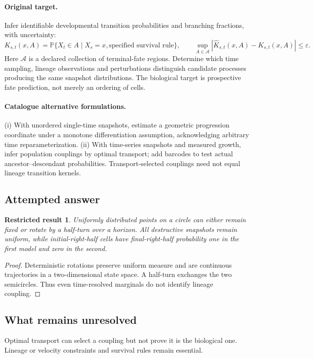\documentclass[11pt]{article}
\newcommand{\Prob}{\mathbb P}
\providecommand{\Prob}{\mathbb P}
\newtheorem{attemptresult}{Restricted result}[section]
\begin{document}
\paragraph{Original target.}
Infer identifiable developmental transition probabilities and branching fractions, with uncertainty:
\[K_{s,t}(x,A)=\Prob\{X_t\in A\mid X_s=x,\text{specified survival rule}\},\qquad \sup_{A\in\mathcal A}|\widehat K_{s,t}(x,A)-K_{s,t}(x,A)|\le\varepsilon.\]
Here $\mathcal A$ is a declared collection of terminal-fate regions. Determine which time sampling, lineage observations and perturbations distinguish candidate processes producing the same snapshot distributions. The biological target is prospective fate prediction, not merely an ordering of cells.
\paragraph{Catalogue alternative formulations.}
(i) With unordered single-time snapshots, estimate a geometric progression coordinate under a monotone differentiation assumption, acknowledging arbitrary time reparameterization. (ii) With time-series snapshots and measured growth, infer population couplings by optimal transport; add barcodes to test actual ancestor--descendant probabilities. Transport-selected couplings need not equal lineage transition kernels.
\subsection{Attempted answer}
\begin{attemptresult}
Uniformly distributed points on a circle can either remain fixed or rotate by a half-turn over a horizon. All destructive snapshots remain uniform, while initial-right-half cells have final-right-half probability one in the first model and zero in the second.
\end{attemptresult}
\begin{proof}
Deterministic rotations preserve uniform measure and are continuous trajectories in a two-dimensional state space. A half-turn exchanges the two semicircles. Thus even time-resolved marginals do not identify lineage coupling.
\end{proof}
\subsection{What remains unresolved}
Optimal transport can select a coupling but not prove it is the biological one. Lineage or velocity constraints and survival rules remain essential.
\end{document}
